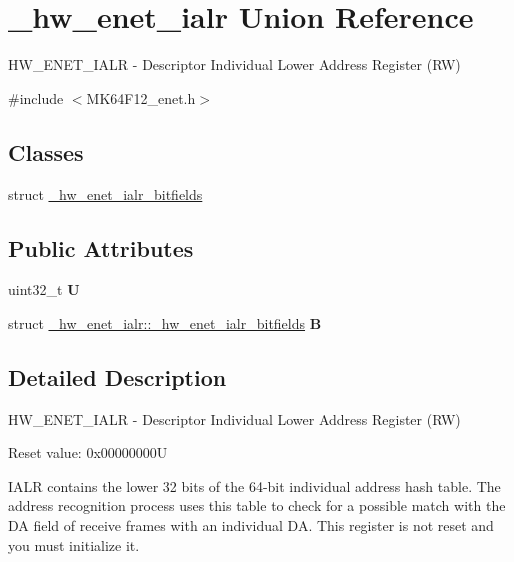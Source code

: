 \hypertarget{union__hw__enet__ialr}{}\section{\+\_\+hw\+\_\+enet\+\_\+ialr Union Reference}
\label{union__hw__enet__ialr}


H\+W\+\_\+\+E\+N\+E\+T\+\_\+\+I\+A\+LR -\/ Descriptor Individual Lower Address Register (RW)  




{\ttfamily \#include $<$M\+K64\+F12\+\_\+enet.\+h$>$}

\subsection*{Classes}
\begin{DoxyCompactItemize}
\item 
struct \hyperlink{struct__hw__enet__ialr_1_1__hw__enet__ialr__bitfields}{\+\_\+hw\+\_\+enet\+\_\+ialr\+\_\+bitfields}
\end{DoxyCompactItemize}
\subsection*{Public Attributes}
\begin{DoxyCompactItemize}
\item 
uint32\+\_\+t {\bfseries U}\hypertarget{union__hw__enet__ialr_ae3a01a81d619388ca7fab2400177668b}{}\label{union__hw__enet__ialr_ae3a01a81d619388ca7fab2400177668b}

\item 
struct \hyperlink{struct__hw__enet__ialr_1_1__hw__enet__ialr__bitfields}{\+\_\+hw\+\_\+enet\+\_\+ialr\+::\+\_\+hw\+\_\+enet\+\_\+ialr\+\_\+bitfields} {\bfseries B}\hypertarget{union__hw__enet__ialr_a5eeaae0d0600645e45fb1ab8793dfa6f}{}\label{union__hw__enet__ialr_a5eeaae0d0600645e45fb1ab8793dfa6f}

\end{DoxyCompactItemize}


\subsection{Detailed Description}
H\+W\+\_\+\+E\+N\+E\+T\+\_\+\+I\+A\+LR -\/ Descriptor Individual Lower Address Register (RW) 

Reset value\+: 0x00000000U

I\+A\+LR contains the lower 32 bits of the 64-\/bit individual address hash table. The address recognition process uses this table to check for a possible match with the DA field of receive frames with an individual DA. This register is not reset and you must initialize it. 

